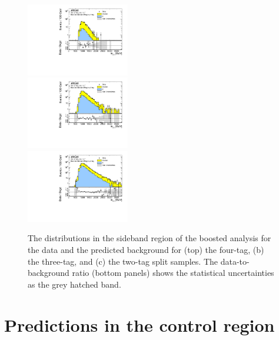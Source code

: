 \begin{figure}[htbp!]
\begin{center}
 \includegraphics[width=0.4\textwidth,angle=-90]{figures/boosted/Paperplot/Moriond_bkg_9_FourTag_Sideband_mHH_l_1.pdf}\\
 \includegraphics[width=0.4\textwidth,angle=-90]{figures/boosted/Paperplot/Moriond_bkg_9_ThreeTag_Sideband_mHH_l_1.pdf}\\
 \includegraphics[width=0.4\textwidth,angle=-90]{figures/boosted/Paperplot/Moriond_bkg_9_TwoTag_split_Sideband_mHH_l_1.pdf}\\
\caption{The \mtwoJ distributions in the sideband region of the boosted analysis for the data and the predicted background for (top) the four-tag, (b) the three-tag, and (c) the two-tag split samples. The data-to-background ratio (bottom panels) shows the statistical uncertainties as the grey hatched band.}
\label{fig:boosted-sb-mjj}
\end{center}
\end{figure}
\section{Predictions in the control region}
\label{sec:boosted-cr}

